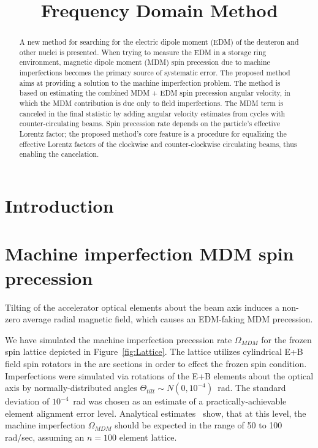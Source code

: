 \documentclass[12pt]{article}
\title{Frequency Domain Method}
\newcommand{\W}{\Omega}
\begin{document}
	\maketitle
	\begin{abstract}
		A new method for searching for the electric dipole moment (EDM) of the deuteron and other nuclei is presented. When trying to measure the EDM in a storage ring environment, magnetic dipole moment (MDM) spin precession due to machine imperfections becomes the primary source of systematic error. The proposed method aims at providing a solution to the machine imperfection problem. The method is based on estimating the combined MDM + EDM spin precession angular velocity, in which the MDM contribution is due only to field imperfections. The MDM term is canceled in the final statistic by  adding angular velocity estimates from cycles with counter-circulating beams. Spin precession rate depends on the particle's effective Lorentz factor; the proposed method's core feature is a procedure for equalizing the effective Lorentz factors of the clockwise and counter-clockwise circulating beams, thus enabling the cancelation.
	\end{abstract}

\tableofcontents

\section{Introduction}

\section{Machine imperfection MDM spin precession}
Tilting of the accelerator optical elements about the beam axis induces a non-zero average radial magnetic field, which causes an EDM-faking MDM precession. 

We have simulated the machine imperfection precession rate $\W_{MDM}$ for the frozen spin lattice depicted in Figure~\ref{fig:Lattice}. The lattice utilizes cylindrical E+B field spin rotators in the arc sections in order to effect the frozen spin condition. Imperfections were simulated via rotations of the E+B elements about the optical axis by normally-distributed angles $\Theta_{tilt}\sim N(0,10^{-4})$~rad. The standard deviation of $10^{-4}$~rad was chosen as an estimate of a practically-achievable element alignment error level. Analytical estimates~\cite{Senichev:FDM} show, that at this level, the machine imperfection $\W_{MDM}$ should be expected in the range of 50 to 100 rad/sec, assuming an $n=100$ element lattice.
\end{document}
